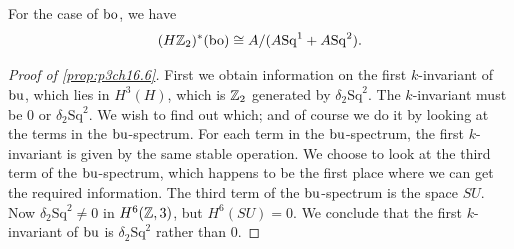 \documentclass[../main]{subfiles}
\begin{document}
    For the case of $\mathrm{bo}$, we have \[
        (H\mathbb{Z}_2)^\ast(\mathrm{bo})\cong A/(A\mathrm{Sq}^1+A\mathrm{Sq}^2).
    \]
    \begin{proof}[Proof of \ref{prop:p3ch16.6}]
     First we obtain information on the first $k$-invariant of $\mathrm{bu}$, which lies in $H^3(H)$, which is $\mathbb{Z}_2$ generated by
$\delta_2\mathrm{Sq}^2$. The $k$-invariant must be $0$ or $\delta_2\mathrm{Sq}^2$. We wish to find out which; and of course we do it by looking at the terms in the $\mathrm{bu}$-spectrum. For each term in the $\mathrm{bu}$-spectrum, the first $k$-invariant is given by the same stable operation. We choose to look at the third term of the $\mathrm{bu}$-spectrum, which happens to be the first place where we can get the required information. The third term of the $\mathrm{bu}$-spectrum is the space $SU$. Now $\delta_2\mathrm{Sq}^2\ne0$ in $H^6(\mathbb{Z},3)$, but $H^6(SU)=0$. We conclude that the first $k$-invariant of $\mathrm{bu}$ is $\delta_2\mathrm{Sq}^2$ rather than $0$.


\end{proof}
\end{document}
